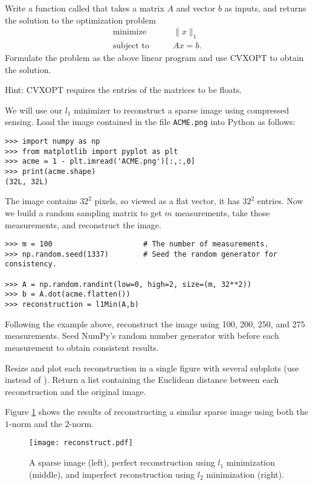 \begin{problem}
Write a function called  that takes a matrix $A$ and vector $b$ as inputs, and returns the solution to the optimization problem 
\begin{align*}
\text{minimize}\qquad &\|x\|_1\\
\text{subject to} \qquad &Ax = b.
\end{align*}
Formulate the problem as the above linear program and use CVXOPT to obtain the solution.

Hint: CVXOPT requires the entries of the matrices to be floats.
\end{problem}

We will use our $l_1$ minimizer to reconstruct a sparse image using compressed sensing.
Load the image contained in the file \texttt{ACME.png} into Python as follows:
\begin{lstlisting}
>>> import numpy as np
>>> from matplotlib import pyplot as plt
>>> acme = 1 - plt.imread('ACME.png')[:,:,0]
>>> print(acme.shape)
(32L, 32L)
\end{lstlisting}
The image contains $32^2$ pixels, so viewed as a flat vector, it has $32^2$ entries.
Now we build a random sampling matrix to get $m$ measurements, take those measurements, and reconstruct the image.
\begin{lstlisting}
>>> m = 100                     # The number of measurements.
>>> np.random.seed(1337)        # Seed the random generator for consistency.

>>> A = np.random.randint(low=0, high=2, size=(m, 32**2))
>>> b = A.dot(acme.flatten())
>>> reconstruction = l1Min(A,b)
\end{lstlisting}

\begin{problem}
Following the example above, reconstruct the image using 100, 200, 250, and 275 measurements.
Seed NumPy's random number generator with  before each measurement to obtain consistent results.

Resize and plot each reconstruction in a single figure with several subplots (use  instead of ).
Return a list containing the Euclidean distance between each reconstruction and the original image.
\end{problem}

Figure \ref{fig:reconstruct} shows the results of reconstructing a similar sparse image using both the $1$-norm and 
the $2$-norm.

\begin{figure}
\centering
\texttt{[image: reconstruct.pdf]}
\caption{A sparse image (left), perfect reconstruction using $l_1$ minimization (middle),  and
imperfect reconstruction using $l_2$ minimization (right).}
\label{fig:reconstruct}
\end{figure}
